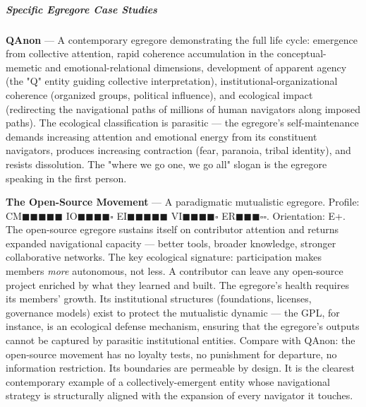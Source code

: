 \subparagraph*{Specific Egregore Case Studies}


\textbf{QAnon} — A contemporary egregore demonstrating the full life cycle: emergence from collective attention, rapid coherence accumulation in the conceptual-memetic and emotional-relational dimensions, development of apparent agency (the "Q" entity guiding collective interpretation), institutional-organizational coherence (organized groups, political influence), and ecological impact (redirecting the navigational paths of millions of human navigators along imposed paths). The ecological classification is parasitic — the egregore's self-maintenance demands increasing attention and emotional energy from its constituent navigators, produces increasing contraction (fear, paranoia, tribal identity), and resists dissolution. The "where we go one, we go all" slogan is the egregore speaking in the first person.


\textbf{The Open-Source Movement} — A paradigmatic mutualistic egregore. Profile: CM$\blacksquare$$\blacksquare$$\blacksquare$$\blacksquare$$\blacksquare$ IO$\blacksquare$$\blacksquare$$\blacksquare$$\blacksquare$$\square$ EI$\blacksquare$$\blacksquare$$\blacksquare$$\blacksquare$$\blacksquare$ VI$\blacksquare$$\blacksquare$$\blacksquare$$\blacksquare$$\square$ ER$\blacksquare$$\blacksquare$$\blacksquare$$\square$$\square$. Orientation: E+. The open-source egregore sustains itself on contributor attention and returns expanded navigational capacity — better tools, broader knowledge, stronger collaborative networks. The key ecological signature: participation makes members \textit{more} autonomous, not less. A contributor can leave any open-source project enriched by what they learned and built. The egregore's health requires its members' growth. Its institutional structures (foundations, licenses, governance models) exist to protect the mutualistic dynamic — the GPL, for instance, is an ecological defense mechanism, ensuring that the egregore's outputs cannot be captured by parasitic institutional entities. Compare with QAnon: the open-source movement has no loyalty tests, no punishment for departure, no information restriction. Its boundaries are permeable by design. It is the clearest contemporary example of a collectively-emergent entity whose navigational strategy is structurally aligned with the expansion of every navigator it touches.



